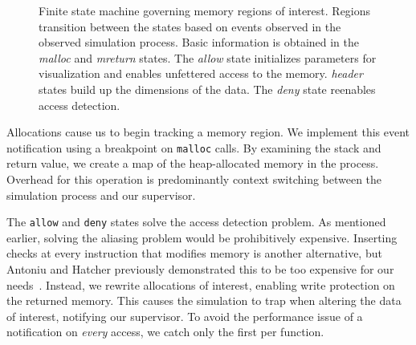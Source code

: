 \begin{figure}
  \centering

  \caption{Finite state machine governing memory regions of interest.
  Regions transition between the states based on events observed in
  the observed simulation process.  Basic information is obtained in
  the \emph{malloc} and \emph{mreturn} states.  The \emph{allow} state
  initializes parameters for visualization and enables unfettered
  access to the memory. \emph{header} states build up the dimensions of
  the data.  The \emph{deny} state reenables access detection.}
  \label{fig:fsm}

\end{figure}

Allocations cause us to begin tracking a memory region.  We implement
this
event notification using a breakpoint on \texttt{malloc} calls.
By examining the stack and return value, we create a map of the
heap-allocated memory in the process.  Overhead for this operation is
predominantly context switching between the simulation process and our
supervisor.

The \texttt{allow} and \texttt{deny} states solve the access detection
problem.  As mentioned earlier, solving the aliasing problem would
be prohibitively expensive.  Inserting checks at every instruction
that modifies memory is another alternative, but Antoniu and Hatcher
previously demonstrated this
to be too expensive for our needs~\cite{Antoniu:2001:PFault}.  Instead,
we rewrite allocations of interest, enabling write protection on the
returned memory.  This causes the simulation to trap when altering the
data of interest, notifying our supervisor.  To avoid the
performance issue of a notification on \emph{every} access, we catch
only the first per function.

